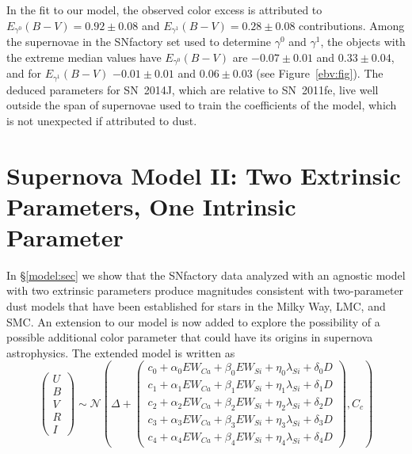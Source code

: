\documentclass{aastex61}   	%
\begin{document}
In the fit to our model, the observed color excess is attributed to 
$E_{\gamma^0}(B-V)=  0.92 \pm   0.08$ and  $E_{\gamma^1}(B-V)=  0.28 \pm   0.08$
contributions.
Among the supernovae in the SNfactory  set used to determine $\gamma^0$ and $\gamma^1$, the
objects with the extreme median values have 
$E_{\gamma^0}(B-V)$ are $-0.07 \pm 0.01$ and  $  0.33 \pm 0.04$,
and for $E_{\gamma^1}(B-V)$ $-0.01 \pm 0.01$  and
$  0.06 \pm 0.03$ 
(see Figure~\ref{ebv:fig}).
The deduced parameters for SN~2014J, which are relative to SN~2011fe, live well outside the 
span of supernovae used to train the coefficients of the model, which is not unexpected if
attributed to dust. 



\section{Supernova Model II: Two Extrinsic Parameters, One Intrinsic Parameter}
\label{model2:sec}
In \S\ref{model:sec} we show that the SNfactory data analyzed with an agnostic model with
two extrinsic parameters produce
magnitudes consistent
with two-parameter dust models that have been established for stars in the Milky Way, LMC, and SMC.
An extension to our model is now added to explore the possibility of
a possible additional
color parameter that could have its origins in supernova astrophysics.
The extended model is written as
\begin{equation}
\begin{pmatrix}
U\\B\\V\\R\\I
\end{pmatrix}
\sim \mathcal{N}
\left(
\Delta +
\begin{pmatrix}
c_0+\alpha_0 EW_{Ca} + \beta_0 EW_{Si} + \eta_0 \lambda_{Si} + \delta_0 D\\
c_1+\alpha_1 EW_{Ca} + \beta_1 EW_{Si} + \eta_1 \lambda_{Si} + \delta_1 D \\
c_2+\alpha_2 EW_{Ca} + \beta_2 EW_{Si} + \eta_2 \lambda_{Si} + \delta_2 D\\
c_3+\alpha_3 EW_{Ca} + \beta_3 EW_{Si} + \eta_3 \lambda_{Si} + \delta_3 D\\
c_4+\alpha_4 EW_{Ca} + \beta_4 EW_{Si}+ \eta_4 \lambda_{Si} + \delta_4 D
\end{pmatrix}
,C_{c}
\right)
\label{ewsiv:eqn}
\end{equation}
\end{document}
